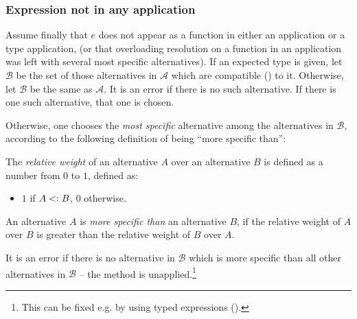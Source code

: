\subsubsection{Expression not in any application}
\label{sec:overloading-resolution-no-app}

Assume finally that $e$ does not appear as a function in either an application or a type application, (or that overloading resolution on a function in an application was left with several most specific alternatives). If an expected type is given, let $\mathcal{B}$ be the set of those alternatives in $\mathcal{A}$ which are compatible () to it. Otherwise, let $\mathcal{B}$ be the same as $\mathcal{A}$. It is an error if there is no such alternative. If there is one such alternative, that one is chosen. 

Otherwise, one chooses the {\em most specific} alternative among the alternatives in $\mathcal{B}$, according to the following definition of being ``more specific than'':

\begin{definition}
The {\em relative weight} of an alternative $A$ over an alternative $B$ is defined as a number from $0$ to $1$, defined as:
\begin{itemize}
\item $1$ if $A <: B$, $0$ otherwise.
\end{itemize}
\end{definition}

An alternative $A$ is {\em more specific than} an alternative $B$, if the relative weight of $A$ over $B$ is greater than the relative weight of $B$ over $A$. 

It is an error if there is no alternative in $\mathcal{B}$ which is more specific than all other alternatives in $\mathcal{B}$ -- the method is unapplied.\footnote{This can be fixed e.g. by using typed expressions ().}








